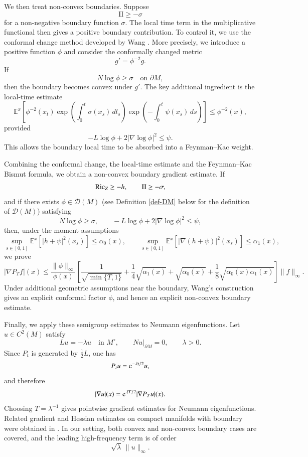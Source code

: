 \documentclass[11pt,twoside, reqno]{article}
\def\e{{\rm e}}
\def\mathpal#1{\mathop{\mathchoice{\text{\rm #1}}%
   {\text{\rm #1}}{\text{\rm #1}}%
   {\text{\rm #1}}}\nolimits}
\newcommand\Ric{\mathpal{Ric}}
\newcommand\1{\mathbbm{1}}
\newcommand\II{\mathrm{II}}
\theoremstyle{definition}
\numberwithin{equation}{section}
\def \e{{\rm e}}
\begin{document}
We then treat non-convex boundaries. Suppose
\[
        \II\geq-\sigma
\]
for a non-negative boundary function \(\sigma\). The local time term in the
multiplicative functional then gives a positive boundary contribution. To
control it, we use the conformal change method developed by Wang
\cite{Wang:2007,Wbook14}. More precisely, we introduce a positive function
\(\phi\) and consider the conformally changed metric
\[
        g'=\phi^{-2}g.
\]
If
\[
        N\log\phi\geq\sigma
        \quad\text{on }\partial M,
\]
then the boundary becomes convex under \(g'\). The key additional ingredient
is the local-time estimate
\[
\mathbb E^x
\left[
\phi^{-2}(x_t)
\exp\left(\int_0^t\sigma(x_s)\,dl_s\right)
\exp\left(-\int_0^t\psi(x_s)\,ds\right)
\right]
\leq
\phi^{-2}(x),
\]
provided
\[
        -L\log\phi+2|\nabla\log\phi|^2\leq\psi .
\]
This allows the boundary local time to be absorbed into a Feynman--Kac weight.

Combining the conformal change, the local-time estimate and the
Feynman--Kac Bismut formula, we obtain a non-convex boundary gradient estimate.
If
\[
        \Ric_Z\geq -h,
        \qquad
        \II\geq-\sigma,
\]
and if there exists \(\phi\in\mathcal D(M)\) (see Definition \ref{def-DM} below for the definition of $\mathcal D(M)$) satisfying
\[
        N\log\phi\geq\sigma,
        \qquad
        -L\log\phi+2|\nabla\log\phi|^2\leq \psi,
\]
then, under the moment assumptions
\[
        \sup_{s\in[0,1]}
        \mathbb E^x[|h+\psi|^2(x_s)]\leq\alpha_0(x),
        \qquad
        \sup_{s\in[0,1]}
        \mathbb E^x[|\nabla(h+\psi)|^2(x_s)]
        \leq\alpha_1(x),
\]
we prove
\[
        |\nabla P_Tf|(x)
        \leq
        \frac{\|\phi\|_\infty}{\phi(x)}
        \left[
        \frac1{\sqrt{\min\{T,1\}}}
        +
        \frac14\sqrt{\alpha_1(x)}
        +
        \sqrt{\alpha_0(x)}
        +
        \frac18\sqrt{\alpha_0(x)\alpha_1(x)}
        \right]
        \|f\|_\infty .
\]
Under additional geometric assumptions near the boundary, Wang's construction
\cite{Wang:2007,wang2005functional,Wbook14} gives an explicit conformal factor
\(\phi\), and hence an explicit non-convex boundary estimate.

Finally, we apply these semigroup estimates to Neumann eigenfunctions. Let
\(u\in C^2(M)\) satisfy
\[
        Lu=-\lambda u
        \quad\text{in }M^\circ,
        \qquad
        Nu|_{\partial M}=0,
        \qquad
        \lambda>0.
\]
Since \(P_t\) is generated by \(\frac12L\), one has
\[
        P_tu=\e^{-\lambda t/2}u,
\]
and therefore
\[
        |\nabla u|(x)=\e^{\lambda T/2}|\nabla P_Tu|(x).
\]
Choosing \(T=\lambda^{-1}\) gives pointwise gradient estimates for Neumann
eigenfunctions. Related gradient and Hessian estimates on compact manifolds
with boundary were obtained in
\cite{ArnaudonThalmaierWang2020,ChengThalmaierWang2024Hessian}. In our setting,
both convex and non-convex boundary cases are covered, and the leading
high-frequency term is of order
\[
        \sqrt{\lambda}\,\|u\|_\infty .
\]
\end{document}
